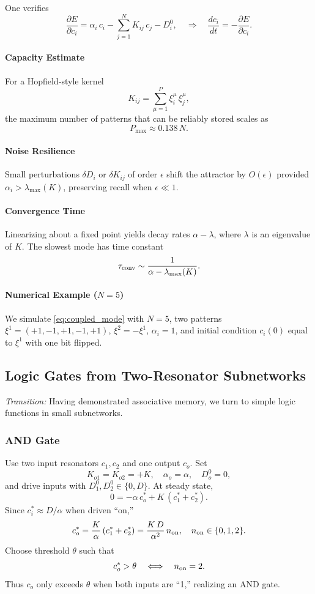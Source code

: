 One verifies
\[
\frac{\partial E}{\partial c_i}
= \alpha_i\,c_i - \sum_{j=1}^N K_{ij}\,c_j - D_i^0,
\quad
\Longrightarrow
\quad
\frac{dc_i}{dt} = -\frac{\partial E}{\partial c_i}.
\]

\paragraph{Capacity Estimate}
For a Hopfield‐style kernel
\[
K_{ij} = \sum_{\mu=1}^P \xi_i^\mu\,\xi_j^\mu,
\]
the maximum number of patterns that can be reliably stored scales as
\[
P_{\max} \approx 0.138\,N.
\]

\paragraph{Noise Resilience}
Small perturbations $\delta D_i$ or $\delta K_{ij}$ of order $\epsilon$ shift the attractor by $O(\epsilon)$ provided $\alpha_i > \lambda_{\max}(K)$, preserving recall when $\epsilon\ll1$.

\paragraph{Convergence Time}
Linearizing about a fixed point yields decay rates $\alpha - \lambda$, where $\lambda$ is an eigenvalue of $K$.  The slowest mode has time constant
\[
\tau_{\rm conv} \sim \frac{1}{\alpha - \lambda_{\max}(K)}.
\]

\paragraph{Numerical Example ($N=5$)}
We simulate \eqref{eq:coupled_mode} with $N=5$, two patterns 
$\xi^1=(+1,-1,+1,-1,+1)$, $\xi^2=-\xi^1$, 
$\alpha_i=1$, and initial condition $c_i(0)$ equal to $\xi^1$ with one bit flipped.  

\subsection{Logic Gates from Two-Resonator Subnetworks}
\emph{Transition:} Having demonstrated associative memory, we turn to simple logic functions in small subnetworks.

\subsubsection{AND Gate}
Use two input resonators $c_1,c_2$ and one output $c_o$.  Set
\[
K_{o1} = K_{o2} = +K,\quad \alpha_o = \alpha,\quad D_o^0 = 0,
\]
and drive inputs with $D_1^0, D_2^0 \in \{0, D\}$.  At steady state,
\[
0 = -\alpha\,c_o^* + K\,(c_1^* + c_2^*).
\]
Since $c_i^* \approx D/\alpha$ when driven “on,”
\[
c_o^* = \frac{K}{\alpha}\,(c_1^* + c_2^*) = \frac{K\,D}{\alpha^2}\,n_{\rm on},
\quad n_{\rm on} \in \{0,1,2\}.
\]
Choose threshold $\theta$ such that
\[
c_o^* > \theta \quad\Longleftrightarrow\quad n_{\rm on} = 2.
\]
Thus $c_o$ only exceeds $\theta$ when both inputs are “1,” realizing an AND gate.

